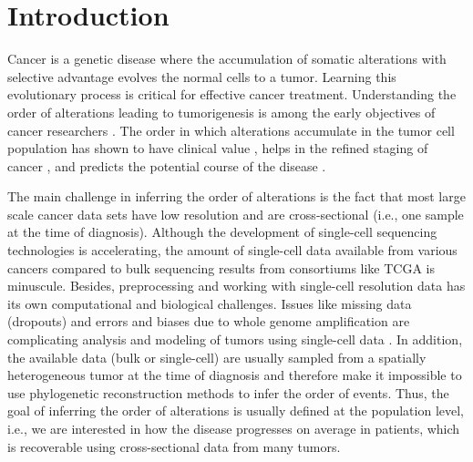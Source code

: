 \documentclass{bmcart}
\begin{document}
	
	
\section{Introduction}
Cancer is a genetic disease where the accumulation of somatic alterations with selective advantage evolves the normal cells to a tumor. Learning this evolutionary process is critical for effective cancer treatment. Understanding the order of alterations leading to tumorigenesis is among the early objectives of cancer researchers \cite{vogelstein1988genetic}. The order in which alterations accumulate in the tumor cell population has shown to have clinical value \cite{Beerenwinkel2015-it}, helps in the refined staging of cancer \cite{vogelstein1988genetic}, and predicts the potential course of the disease \cite{Hosseini2019-xc}. 

The main challenge in inferring the order of alterations is the fact that most large scale cancer data sets have low resolution and are cross-sectional (i.e., one sample at the time of diagnosis). Although the development of single-cell sequencing technologies is accelerating, the amount of single-cell data available from various cancers compared to bulk sequencing results from consortiums like TCGA \cite{Cancer_Genome_Atlas_Research_Network2013-ee} is minuscule. Besides, preprocessing and working with single-cell resolution data has its own computational and biological challenges. Issues like missing data (dropouts) and errors and biases due to whole genome amplification are complicating analysis and modeling of tumors using single-cell data \cite{Lahnemann2020-ao}. In addition, the available data (bulk or single-cell) are usually sampled from a spatially heterogeneous tumor at the time of diagnosis \cite{Marusyk2020-ee} and therefore make it impossible to use phylogenetic reconstruction methods to infer the order of events. Thus, the goal of inferring the order of alterations is usually defined at the population level, i.e., we are interested in how the disease progresses on average in patients, which is recoverable using cross-sectional data from many tumors. 
\end{document}
